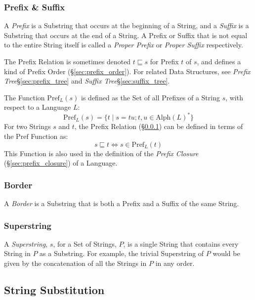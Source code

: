 \subsubsection{Prefix \& Suffix}\label{sec:prefix_suffix}

A \emph{Prefix} is a Substring that occurs at the beginning of a
String, and a \emph{Suffix} is a Substring that occurs at the end of a
String. A Prefix or Suffix that is not equal to the entire String
itself is called a \emph{Proper Prefix} or \emph{Proper Suffix}
respectively.

The Prefix Relation is sometimes denoted $t \sqsubseteq s$ for Prefix
$t$ of $s$, and defines a kind of Prefix Order
(\S\ref{sec:prefix_order}). For related Data Structures, see
\emph{Prefix Tree}\S\ref{sec:prefix_tree} and \emph{Suffix
  Tree}\S\ref{sec:suffix_tree}.

The Function $\mathrm{Pref}_L(s)$ is defined as the Set of all
Prefixes of a String $s$, with respect to a Language $L$:
\[
  \mathrm{Pref}_L(s) =
    \{ t\;|\;s = tu; t,u \in \mathrm{Alph}(L)^* \}
\]
For two Strings $s$ and $t$, the Prefix Relation
(\S\ref{sec:prefix_suffix}) can be defined in terms of the
$\mathrm{Pref}$ Function as:
\[
  s \sqsubseteq t \Leftrightarrow s \in \mathrm{Pref}_L(t)
\]
This Function is also used in the definition of the \emph{Prefix
  Closure} (\S\ref{sec:prefix_closure}) of a Language.



\subsubsection{Border}\label{sec:string_border}

A \emph{Border} is a Substring that is both a Prefix and a Suffix of
the same String.



\subsubsection{Superstring}\label{sec:superstring}

A \emph{Superstring}, $s$, for a Set of Strings, $P$, is a single
String that contains every String in $P$ as a Substring. For example,
the trivial Superstring of $P$ would be given by the concatenation of
all the Strings in $P$ in any order.



\subsection{String Substitution}\label{sec:string_substitution}

